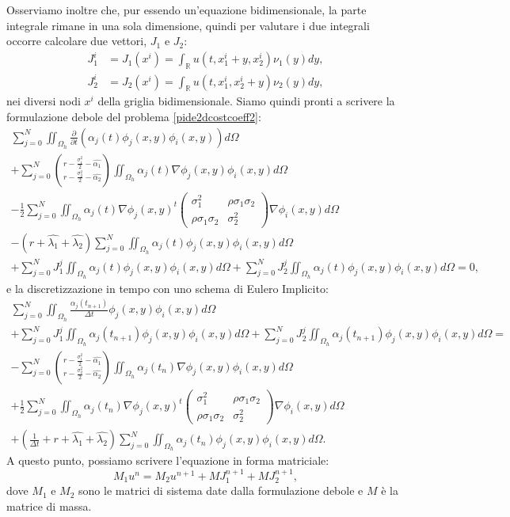 \documentclass[a4paper,10pt]{report}
\theoremstyle{plain}
\theoremstyle{definition}
\theoremstyle{remark}
\begin{document}
Osserviamo inoltre che, pur essendo un'equazione bidimensionale, la parte integrale rimane in una sola dimensione, quindi per valutare i due integrali occorre calcolare due vettori, $J_1$ e $J_2$:
\begin{align*}
J_1^i&=J_1(x^i)=\int_\mathbb{R}u(t,x_1^i+y,x_2^i)\nu_1(y)dy,\\
J_2^i&=J_2(x^i)=\int_\mathbb{R}u(t,x_1^i,x_2^i+y)\nu_2(y)dy,
\end{align*}
nei diversi nodi $x^i$ della griglia bidimensionale. Siamo quindi pronti a scrivere la formulazione debole del problema \eqref{pide2dcostcoeff2}:
\begin{multline}
\sum_{j=0}^{N}\iint_{\Omega_h}\frac{\partial}{\partial t}\left(\alpha_j(t)\phi_j(x,y)\phi_i(x,y)\right)d\Omega\\
+\sum_{j=0}^{N}\binom{r-\frac{\sigma_1^2}{2}-\hat{\alpha_1}}{r-\frac{\sigma_2^2}{2}-\hat{\alpha_2}}\iint_{\Omega_h}\alpha_j(t)\nabla\phi_j(x,y)\phi_i(x,y)d\Omega\\
-\frac{1}{2}\sum_{j=0}^{N}\iint_{\Omega_h}\alpha_j(t)\nabla\phi_j(x,y)^t\left(\begin{matrix}\sigma_1^2 & \rho\sigma_1\sigma_2\\ \rho\sigma_1\sigma_2 & \sigma_2^2 \end{matrix}\right)\nabla\phi_i(x,y)d\Omega\\
-(r+\hat{\lambda_1}+\hat{\lambda_2})\sum_{j=0}^{N}\iint_{\Omega_h}\alpha_j(t)\phi_j(x,y)\phi_i(x,y)d\Omega\\
+\sum_{j=0}^{N}J^j_1\iint_{\Omega_h}\alpha_j(t)\phi_j(x,y)\phi_i(x,y)d\Omega+\sum_{j=0}^{N}J^j_2\iint_{\Omega_h}\alpha_j(t)\phi_j(x,y)\phi_i(x,y)d\Omega=0,
\end{multline}
e la discretizzazione in tempo con uno schema di Eulero Implicito:
\begin{multline}
\sum_{j=0}^{N}\iint_{\Omega_h}\frac{\alpha_j(t_{n+1})}{\Delta t}\phi_j(x,y)\phi_i(x,y)d\Omega\\
+\sum_{j=0}^{N}J^j_1\iint_{\Omega_h}\alpha_j(t_{n+1})\phi_j(x,y)\phi_i(x,y)d\Omega+\sum_{j=0}^{N}J^j_2\iint_{\Omega_h}\alpha_j(t_{n+1})\phi_j(x,y)\phi_i(x,y)d\Omega=\\
-\sum_{j=0}^{N}\binom{r-\frac{\sigma_1^2}{2}-\hat{\alpha_1}}{r-\frac{\sigma_2^2}{2}-\hat{\alpha_2}}\iint_{\Omega_h}\alpha_j(t_n)\nabla\phi_j(x,y)\phi_i(x,y)d\Omega\\
+\frac{1}{2}\sum_{j=0}^{N}\iint_{\Omega_h}\alpha_j(t_n)\nabla\phi_j(x,y)^t\left(\begin{matrix}\sigma_1^2 & \rho\sigma_1\sigma_2\\ \rho\sigma_1\sigma_2 & \sigma_2^2 \end{matrix}\right)\nabla\phi_i(x,y)d\Omega\\
+\left(\frac{1}{\Delta t}+r+\hat{\lambda_1}+\hat{\lambda_2}\right)\sum_{j=0}^{N}\iint_{\Omega_h}\alpha_j(t_n)\phi_j(x,y)\phi_i(x,y)d\Omega.
\end{multline}
A questo punto, possiamo scrivere l'equazione in forma matriciale: $$M_1u^n=M_2u^{n+1}+MJ_1^{n+1}+MJ_2^{n+1},$$ dove $M_1$ e $M_2$ sono le matrici di sistema date dalla formulazione debole e $M$ \`e la matrice di massa.
\end{document}
